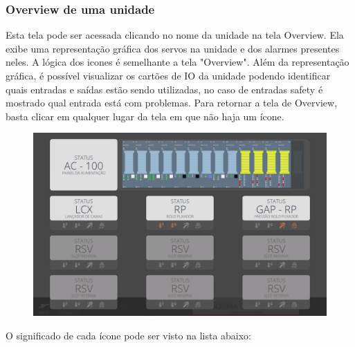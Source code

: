 \newpage
\pagestyle{fancy}
\vspace*{40 pt}

\subsubsection{\small{Overview de uma unidade}}

Esta tela pode ser acessada clicando no nome da unidade na tela Overview. Ela exibe uma representação gráfica dos servos na unidade e dos alarmes presentes neles.
A lógica dos icones é semelhante a tela "Overview". Além da representação gráfica, é possível visualizar os cartões de IO da unidade podendo identificar quais entradas
e saídas estão sendo utilizadas, no caso de entradas safety é mostrado qual entrada está com problemas. Para retornar a tela de Overview, 
basta clicar em qualquer lugar da tela em que não haja um ícone.

\begin{figure}[h]
    \centering
    \includegraphics[width=384 px,height=240 px]{src/imagesICV/13-alarmsScreen/overviewUnidades.png}
  \end{figure}

O significado de cada ícone pode ser visto na lista abaixo:



